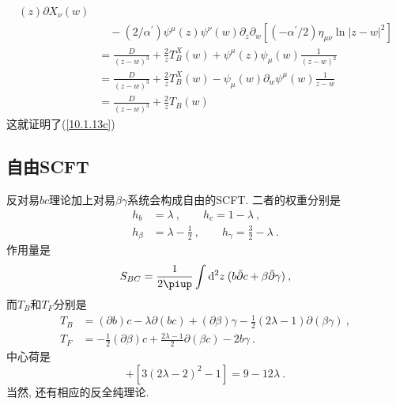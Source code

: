 \begin{tcolorbox}[breakable]
\begin{align*}
{}(z)\partial X_{\nu }(w)\\
&\quad-(2/\alpha ^{\prime })\psi ^{\mu }(z)\psi ^{\nu
}(w)\partial _{z}\partial _{w}[(-\alpha ^{\prime }/2)\eta _{\mu \nu }\ln
|z-w|^{2}] \\
&=\frac{D}{(z-w)^{3}}+\frac{2}{z}T_{B}^{X}(w)+\psi ^{\mu }(z)\psi _{\mu }(w)%
\frac{1}{(z-w)^{2}} \\
&=\frac{D}{(z-w)^{3}}+\frac{2}{z}T_{B}^{X}(w)-\psi _{\mu }(w)\partial
_{w}\psi ^{\mu }(w)\frac{1}{z-w} \\
&=\frac{D}{(z-w)^{3}}+\frac{2}{z}T_{B}(w)
\end{align*}
这就证明了(\ref{10.1.13c})
\end{tcolorbox}

\subsection*{自由SCFT}
反对易$bc$理论加上对易$\beta\gamma$系统会构成自由的SCFT. 二者的权重分别是
\begin{subequations}
\begin{align}
    h_{b}&=\lambda\:,\qquad h_{c}=1-\lambda \:, \label{10.1.16a} \\
    h_{\beta}&=\lambda-\tfrac{1}{2}\:,\qquad h_{\gamma}=\tfrac{3}{2}-\lambda \:. \label{10.1.16b}
\end{align}
\end{subequations}
作用量是
\begin{equation}
    S_{BC}=\frac{1}{2\uppi}\int\dif^{2}z\: (b\bar{\partial}c+\beta\bar{\partial}\gamma)\:, \label{10.1.17}
\end{equation}
而$T_{B}$和$T_{F}$分别是
\begin{subequations}
\begin{align}
    T_{B}&=(\partial b)c-\lambda\partial(bc)+(\partial \beta)\gamma-\frac{1}{2}(2\lambda-1)\partial(\beta\gamma)\:,
    \label{10.1.18a} \\
    T_{F}&=-\frac{1}{2}(\partial \beta)c+ \frac{2\lambda-1}{2}\partial(\beta c)-2b\gamma\:.\label{10.1.18b}
\end{align}
\end{subequations}
中心荷是
\begin{equation}
    [-3(2\lambda-1)^{2}+1]+[3(2\lambda-2)^{2}-1]=9-12\lambda\:.\label{10.1.19}
\end{equation}
当然, 还有相应的反全纯理论.

